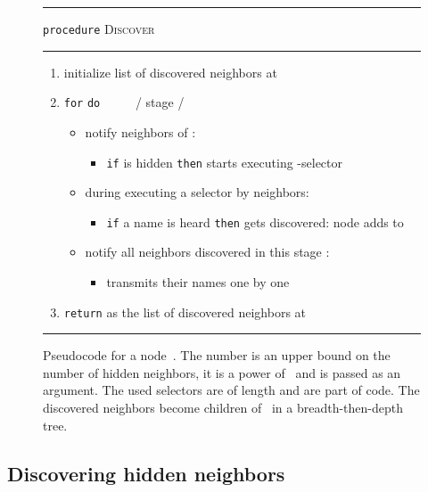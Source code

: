 \documentclass[11pt]{article}
\newcommand{\FF}{\vspace*{\medskipamount}}
\begin{document}
\begin{figure}[t]

\hrule

\FF

\texttt{procedure} \textsc{Discover} 

\FF

\hrule

\FF

\begin{enumerate}[nosep]
\item
initialize list of discovered neighbors  at 
\item
\texttt{for}  \texttt{do} ~ ~ ~ / stage  /
\begin{itemize}[nosep]
\item[]
notify neighbors  of : 
\begin{itemize}[nosep]
\item[]
\texttt{if}  is hidden \texttt{then}  starts executing -selector 
\end{itemize}
\item[]
during executing a selector by neighbors: 
\begin{itemize}[nosep]
\item[]
\texttt{if} a name  is heard \texttt{then}  gets discovered:  
node  adds  to 
\end{itemize}
\item[]
notify all neighbors discovered in this stage : 
\begin{itemize}[nosep]
\item[] 
 transmits their names one by one
\end{itemize}
\end{itemize}
\item
\texttt{return}  as the list of discovered neighbors at  
\end{enumerate}

\FF

\hrule

\caption{\label{proc:Discover}
Pseudocode for a node~.
The number  is an upper bound on the number of hidden neighbors, it is a power of~ and is passed as an argument.
The used selectors are of length  and are part of code.
The discovered neighbors become children of~ in a breadth-then-depth tree.}
\end{figure}



\subsection{Discovering hidden neighbors}
\end{document}
